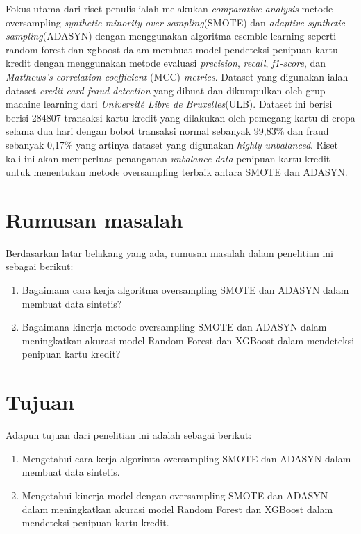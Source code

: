 Fokus utama dari riset penulis ialah melakukan \textit{comparative analysis} metode oversampling \textit{synthetic minority over-sampling}(SMOTE) dan \textit{adaptive synthetic sampling}(ADASYN) dengan menggunakan algoritma esemble learning seperti random forest dan xgboost dalam membuat model pendeteksi penipuan kartu kredit dengan menggunakan metode evaluasi \textit{precision}, \textit{recall}, \textit{f1-score}, dan \textit{Matthews’s correlation coefficient} (MCC) \textit{metrics}. Dataset yang digunakan ialah dataset \textit{credit card fraud detection} yang dibuat dan dikumpulkan oleh grup machine learning dari \textit{Université Libre de Bruxelles}(ULB)\cite{dal2015calibrating}. Dataset ini berisi berisi 284807 transaksi kartu kredit yang dilakukan oleh pemegang kartu di  eropa  selama  dua  hari  dengan bobot  transaksi  normal  sebanyak  99,83\%  dan  fraud  sebanyak  0,17\% yang artinya dataset yang digunakan \textit{highly unbalanced}\cite{WinNT}. Riset kali ini akan memperluas penanganan \textit{unbalance data} penipuan kartu kredit untuk menentukan metode oversampling terbaik antara SMOTE dan ADASYN.

\section{Rumusan masalah} \label{I.Rumusan Masalah}
Berdasarkan latar belakang yang ada, rumusan masalah dalam penelitian ini sebagai berikut:

\begin{enumerate}[noitemsep]
        \item Bagaimana cara kerja algoritma oversampling SMOTE dan ADASYN dalam membuat data sintetis?
        \item Bagaimana kinerja metode oversampling SMOTE dan ADASYN dalam meningkatkan akurasi model Random Forest dan XGBoost dalam mendeteksi penipuan kartu kredit?
\end{enumerate}

\section{Tujuan} \label{I.Tujuan}
Adapun tujuan dari penelitian ini adalah sebagai berikut:
\begin{enumerate}[noitemsep]
        \item Mengetahui cara kerja algorimta oversampling SMOTE dan ADASYN dalam membuat data sintetis.
        \item Mengetahui kinerja model dengan oversampling SMOTE dan ADASYN dalam meningkatkan akurasi model Random Forest dan XGBoost dalam mendeteksi penipuan kartu kredit.
\end{enumerate}

